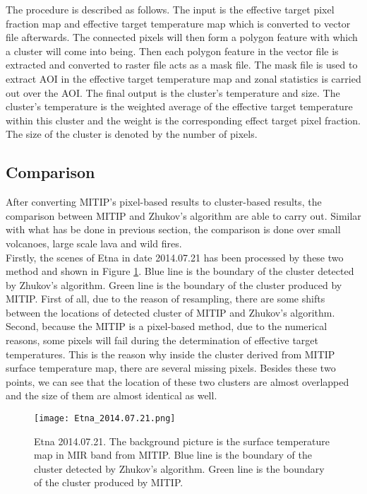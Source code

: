 \noindent The procedure is described as follows. The input is the effective target pixel fraction map and effective target temperature map which is converted to vector file afterwards. The connected pixels will then form a polygon feature with which a cluster will come into being. Then each polygon feature in the vector file is extracted and converted to  raster file acts as a mask file. The mask file is used to extract AOI in the effective target temperature map and zonal statistics is carried out over the AOI. The final output is the cluster's temperature and size. The cluster's temperature is the weighted average of the effective target temperature within this cluster and the weight is the corresponding effect target pixel fraction. The size of the cluster is denoted by the number of pixels.\\


\subsection{Comparison}
After converting MITIP's pixel-based results to cluster-based results, the comparison between MITIP and Zhukov's algorithm are able to carry out. Similar with what has be done in previous section, the comparison is done over small volcanoes, large scale lava and wild fires.\\

Firstly, the scenes of Etna in date 2014.07.21 has been processed by these two method and shown in Figure \ref{fig:Etna_comp}. Blue line is the boundary of the cluster detected by Zhukov's algorithm. Green line is the boundary of the cluster produced by MITIP. First of all, due to the reason of resampling, there are some shifts between the locations of detected cluster of MITIP and Zhukov's algorithm. Second, because the MITIP is a pixel-based method, due to the numerical reasons, some pixels will fail during the determination of effective target temperatures. This is the reason why inside the cluster derived from MITIP surface temperature map, there are several missing pixels. Besides these two points, we can see that the location of these two clusters are almost overlapped and the size of them are almost identical as well.\\

\begin{figure}[!htbp]
\centering
\texttt{[image: Etna\_2014.07.21.png]}
\caption{Etna 2014.07.21. The background picture is the surface temperature map in MIR band from MITIP. Blue line is the boundary of the cluster detected by Zhukov's algorithm. Green line is the boundary of the cluster produced by MITIP.}
\label{fig:Etna_comp}
\end{figure}

